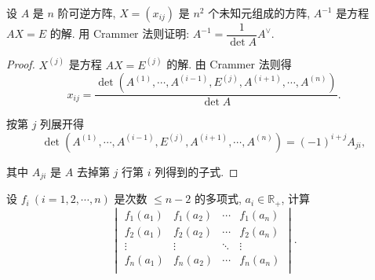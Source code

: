 \documentclass{ctexart}
\begin{document}
\begin{exercisec}[4.3.9]
    设 $A$ 是 $n$ 阶可逆方阵, $X=(x_{ij})$ 是 $n^2$ 个未知元组成的方阵, $A^{-1}$ 是方程 $AX=E$ 的解. 用 Crammer 法则证明: $A^{-1}=\dfrac{1}{\det A}A^\vee$.
\end{exercisec}
\begin{proof}
    $X^{(j)}$ 是方程 $AX=E^{(j)}$ 的解. 由 Crammer 法则得
    \[x_{ij}=\dfrac{\det(A^{(1)},\cdots,A^{(i-1)},E^{(j)},A^{(i+1)},\cdots,A^{(n)})}{\det A}.\]

    按第 $j$ 列展开得
    \[\det(A^{(1)},\cdots,A^{(i-1)},E^{(j)},A^{(i+1)},\cdots,A^{(n)})=(-1)^{i+j}A_{ji},\]

    其中 $A_{ji}$ 是 $A$ 去掉第 $j$ 行第 $i$ 列得到的子式.
\end{proof}
\begin{exercisec}
    设 $f_i\ (i=1,2,\cdots,n)$ 是次数 $\leq n-2$ 的多项式, $a_i\in\mathbb{R}_+$, 计算
    \[\begin{vmatrix}
        f_1(a_1) & f_1(a_2) & \cdots & f_1(a_n) \\
        f_2(a_1) & f_2(a_2) & \cdots & f_2(a_n) \\
        \vdots & \vdots & \ddots & \vdots \\
        f_n(a_1) & f_n(a_2) & \cdots & f_n(a_n) \\
    \end{vmatrix}.\]
\end{exercisec}
\end{document}

